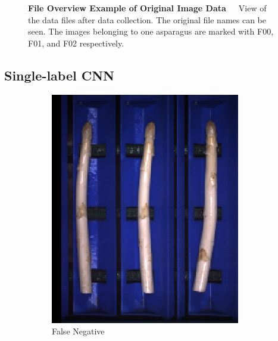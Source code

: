 \begin{figure}[h]
	\decoRule
	\caption[File Overview Example of Original Image Data]{\textbf{File Overview Example of Original Image Data}~~~View of the data files after data collection. The original file names can be seen. The images belonging to one asparagus are marked with F00, F01, and F02 respectively.}
	\label{fig:Original_Data_Overview}
\end{figure}

\subsection{Single-label CNN}
\label{sec:AdditionalSingleLabelCNN}

\begin{figure}[!htb]
	\centering
	\begin{subfigure}{0.3\textwidth}
		\includegraphics[width=0.9\linewidth]{Figures/appendix/violet_falsenegative_01.png}
		\vspace{-5pt}
		\caption{False Negative}
	\end{subfigure}
	\begin{subfigure}{0.3\textwidth}

\end{subfigure}
\end{figure}
